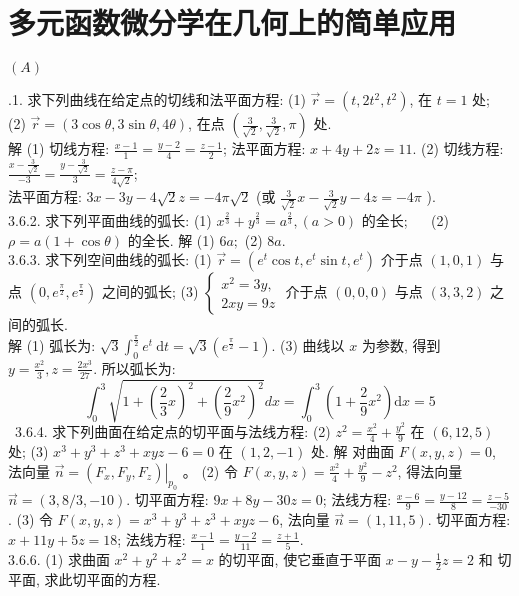 \documentclass[a4paper,11pt,UTF8]{article}
\begin{document}
\section{多元函数微分学在几何上的简单应用}
\centerline{$(A)$}
.1. 求下列曲线在给定点的切线和法平面方程:
(1) $\vec{r}=\left(t, 2 t^2, t^2\right)$, 在 $t=1$ 处; (2) $\vec{r}=(3 \cos \theta, 3 \sin \theta, 4 \theta)$, 在点 $\left(\frac{3}{\sqrt{2}}, \frac{3}{\sqrt{2}}, \pi\right)$ 处.\\
解 (1) 切线方程: $\frac{x-1}{1}=\frac{y-2}{4}=\frac{z-1}{2}$; 法平面方程: $x+4 y+2 z=11$.
(2) 切线方程: $\frac{x-\frac{3}{\sqrt{2}}}{-3}=\frac{y-\frac{3}{\sqrt{2}}}{3}=\frac{z-\pi}{4 \sqrt{2}}$;\\
法平面方程: $3 x-3 y-4 \sqrt{2} z=-4 \pi \sqrt{2}$ (或 $\frac{3}{\sqrt{2}} x-\frac{3}{\sqrt{2}} y-4 z=-4 \pi$ ).\\
3.6.2. 求下列平面曲线的弧长:
(1) $x^{\frac{2}{3}}+y^{\frac{2}{3}}=a^{\frac{2}{3}},(a>0)$ 的全长; $\quad$ (2) $\rho=a(1+\cos \theta)$ 的全长.
解 (1) $6 a ;$ (2) $8 a$.\\
3.6.3. 求下列空间曲线的弧长:
(1) $\vec{r}=\left(e^t \cos t, e^t \sin t, e^t\right)$ 介于点 $(1,0,1)$ 与点 $\left(0, e^{\frac{\pi}{2}}, e^{\frac{\pi}{2}}\right)$ 之间的弧长;
(3) $\left\{\begin{array}{l}x^2=3 y, \\ 2 x y=9 z\end{array}\right.$ 介于点 $(0,0,0)$ 与点 $(3,3,2)$ 之间的弧长.\\
解 (1) 弧长为: $\sqrt{3} \int_0^{\frac{\pi}{2}} e^t \mathrm{~d} t=\sqrt{3}\left(e^{\frac{\pi}{2}}-1\right)$.
(3) 曲线以 $x$ 为参数, 得到 $y=\frac{x^2}{3}, z=\frac{2 x^3}{27}$. 所以弧长为:
$$
\int_0^3 \sqrt{1+\left(\frac{2}{3} x\right)^2+\left(\frac{2}{9} x^2\right)^2} d x=\int_0^3\left(1+\frac{2}{9} x^2\right) \mathrm{d} x=5
$$\
3.6.4. 求下列曲面在给定点的切平面与法线方程:
(2) $z^2=\frac{x^2}{4}+\frac{y^2}{9}$ 在 $(6,12,5)$ 处; (3) $x^3+y^3+z^3+x y z-6=0$ 在 $(1,2,-1)$ 处.
解 对曲面 $F(x, y, z)=0$, 法向量 $\vec{n}=\left.\left(F_x, F_y, F_z\right)\right|_{p_0}$ 。
(2) 令 $F(x, y, z)=\frac{x^2}{4}+\frac{y^2}{9}-z^2$, 得法向量 $\vec{n}=(3,8 / 3,-10)$.
切平面方程: $9 x+8 y-30 z=0$; 法线方程: $\frac{x-6}{9}=\frac{y-12}{8}=\frac{z-5}{-30}$.
(3) 令 $F(x, y, z)=x^3+y^3+z^3+x y z-6$, 法向量 $\vec{n}=(1,11,5)$.
切平面方程: $x+11 y+5 z=18$; 法线方程: $\frac{x-1}{1}=\frac{y-2}{11}=\frac{z+1}{5}$.\\
3.6.6. (1) 求曲面 $x^2+y^2+z^2=x$ 的切平面, 使它垂直于平面 $x-y-\frac{1}{2} z=2$ 和 切平面, 求此切平面的方程.\\
\end{document}
